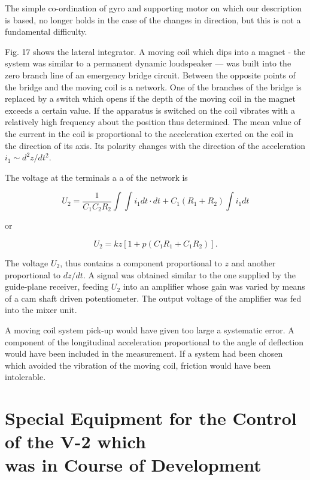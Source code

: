 \documentclass[12pt, a4paper]{article}
\begin{document}
The simple co-ordination of gyro and supporting motor on which our description is based, no longer holds in the case of the changes in direction, but this is not a fundamental difficulty.

Fig. 17 shows the lateral integrator. A moving coil which dips into a magnet - the system was similar to a permanent dynamic loudspeaker — was built into the zero branch line of an emergency bridge circuit. Between the opposite points of the bridge and the moving coil is a network. One of the branches of the bridge is replaced by a switch which opens if the depth of the moving coil in the magnet exceeds a certain value. If the apparatus is switched on the coil vibrates with a relatively high frequency about the position thus determined. The mean value of the current in the coil is proportional to the acceleration exerted on the coil in the direction of its axis. Its polarity changes with the direction of the acceleration $i_{1}\sim d^{2}z/dt^{2}$.

The voltage at the terminals a a of the network is

\begin{equation}
  U_{2}=\frac{1}{C_{1}C_{2}R_{2}}\int\int i_{1}dt\cdot dt+C_{1}(R_{1}+R_{2})\int i_{1}dt
\end{equation}

or

\begin{equation}
  U_{2}=kz\left[1+p(C_{1}R_{1}+C_{1}R_{2})\right]  .
\end{equation}

The voltage $U_{2}$, thus contains a component proportional to $z$ and another proportional to $dz/dt$. A signal was obtained similar to the one supplied by the guide-plane receiver, feeding $U_{2}$ into an amplifier whose gain was varied by means of a cam shaft driven potentiometer. The output voltage of the amplifier was fed into the mixer unit.

A moving coil system pick-up would have given too large a systematic error. A component of the longitudinal acceleration proportional to the angle of deflection would have been included in the measurement. If a system had been chosen which avoided the vibration of the moving coil, friction would have been intolerable.

\section[Special Equipment for the Control of the V-2 which was in Course of Development]{Special Equipment for the Control of the V-2 which\\was in Course of Development}
\end{document}
